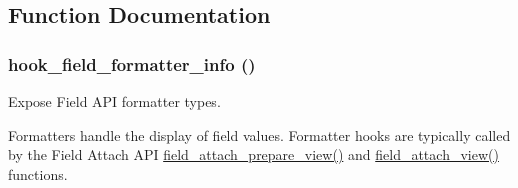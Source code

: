 \subsection{Function Documentation}
\hypertarget{group__field__formatter_ga2f5aa1c7455f55dffd84a48efa57f987}{
\subsubsection[{hook\_\-field\_\-formatter\_\-info}]{\setlength{\rightskip}{0pt plus 5cm}hook\_\-field\_\-formatter\_\-info ()}}
\label{group__field__formatter_ga2f5aa1c7455f55dffd84a48efa57f987}
Expose Field API formatter types.

Formatters handle the display of field values. Formatter hooks are typically called by the Field Attach API \hyperlink{group__field__attach_ga12b5fce5e2b2adb487c485c63bfe0298}{field\_\-attach\_\-prepare\_\-view()} and \hyperlink{group__field__attach_gaa752a8fd31173fd2308d71eb059e00c7}{field\_\-attach\_\-view()} functions.

